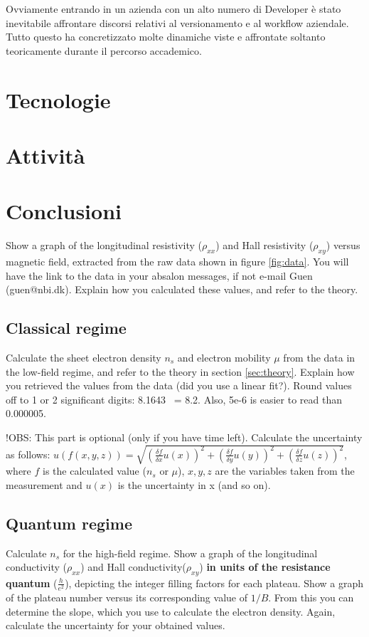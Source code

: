 \documentclass[a4paper]{article}
\begin{document}
Ovviamente entrando in un azienda con un alto numero di Developer è stato inevitabile
affrontare discorsi relativi al versionamento e al workflow aziendale. Tutto questo
ha concretizzato molte dinamiche viste e affrontate soltanto teoricamente durante il 
percorso accademico. 

\section{Tecnologie}
\label{sec:Tecnologie}

\section{Attività}

\section{Conclusioni}
Show a graph of the longitudinal resistivity ($\rho_{xx}$) and Hall resistivity ($\rho_{xy}$) versus magnetic field, extracted from the raw data shown in figure \ref{fig:data}. You will have the link to the data in your absalon messages, if not e-mail Guen (guen@nbi.dk). Explain how you calculated these values, and refer to the theory.

\subsection{Classical regime}
Calculate the sheet electron density $n_{s}$ and electron mobility $\mu$ from the data in the low-field regime, and refer to the theory in section \ref{sec:theory}. Explain how you retrieved the values from the data (did you use a linear fit?).
Round values off to 1 or 2 significant digits: 8.1643 ~= 8.2. Also, 5e-6 is easier to read than 0.000005.

!OBS: This part is optional (only if you have time left).
Calculate the uncertainty as follows: \newline $u(f(x, y, z)) = \sqrt{(\frac{\delta f}{\delta{x}} u(x))^{2} + (\frac{\delta f}{\delta{y}} u(y))^{2} + (\frac{\delta f}{\delta{z}} u(z))^{2}}$, where $f$ is the calculated value ($n_{s}$ or $\mu$), $x, y, z$ are the variables taken from the measurement and $u(x)$ is the uncertainty in x (and so on).

\subsection{Quantum regime}
Calculate $n_{s}$ for the high-field regime.
Show a graph of the longitudinal conductivity ($\rho_{xx}$) and Hall conductivity($\rho_{xy}$) \textbf{in units of the resistance quantum} ($\frac{h}{e^{2}}$), depicting the integer filling factors for each plateau.
Show a graph of the plateau number versus its corresponding value of $1/B$. From this you can determine the slope, which you use to calculate the electron density.
Again, calculate the uncertainty for your obtained values.
\end{document}
